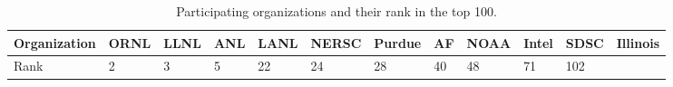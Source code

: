 \begin{table*}[t]
\centering
\caption{Participating organizations and their rank in the top 100.}
\begin{tabular}{|p{59pt}|l|l|l|l|l|l|l|l|l|l|l|}
\hline
Organization&
ORNL&
LLNL&
ANL&
LANL&
NERSC&
Purdue&
AF&
NOAA&
Intel&
SDSC&
Illinois \\
\hline
Rank&
2&
3&
5&
22&
24&
28&
40&
48&
71&
102&
 \\
\hline
\end{tabular}
\label{tab5}
\end{table*}

